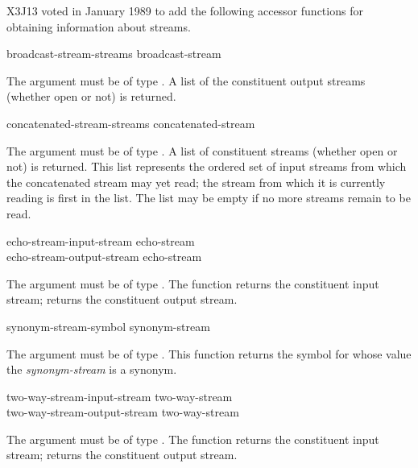 \begin{new}
X3J13 voted in January 1989
to add the following accessor functions
for obtaining information about streams.


\begin{defun}[Function]
broadcast-stream-streams broadcast-stream

The argument must be of type .
A list of the constituent output streams (whether open or not) is returned.
\end{defun}


\begin{defun}[Function]
concatenated-stream-streams concatenated-stream

The argument must be of type .
A list of constituent streams (whether open or not) is returned.
This list represents the ordered set of input streams from which
the concatenated stream may yet read; the stream from which it is
currently reading is first in the list.  The list may be empty
if no more streams remain to be read.
\end{defun}


\begin{defun}[Function]
echo-stream-input-stream echo-stream \\
echo-stream-output-stream echo-stream

The argument must be of type .
The function  returns the constituent
input stream;  returns the constituent
output stream.
\end{defun}


\begin{defun}[Function]
synonym-stream-symbol synonym-stream

The argument must be of type .  This function returns
the symbol for whose value the {\it synonym-stream} is a synonym.
\end{defun}


\begin{defun}[Function]
two-way-stream-input-stream two-way-stream \\
two-way-stream-output-stream two-way-stream

The argument must be of type .
The function  returns the constituent
input stream;  returns the constituent
output stream.
\end{defun}
\end{new}

